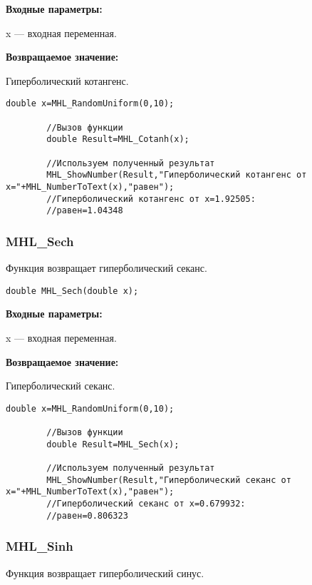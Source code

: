 \documentclass[a4paper,12pt]{article}
\begin{document}
\textbf{Входные параметры:}

 x --- входная переменная.

\textbf{Возвращаемое значение:}

Гиперболический котангенс.


\begin{lstlisting}[label=code_use_MHL_Cotanh,caption=Пример использования]
        double x=MHL_RandomUniform(0,10);

        //Вызов функции
        double Result=MHL_Cotanh(x);

        //Используем полученный результат
        MHL_ShowNumber(Result,"Гиперболический котангенс от x="+MHL_NumberToText(x),"равен");
        //Гиперболический котангенс от x=1.92505:
        //равен=1.04348
\end{lstlisting}

\subsubsection{MHL\_Sech}\label{MHL_Sech}

Функция возвращает гиперболический секанс.


\begin{lstlisting}[label=code_syntax_MHL_Sech,caption=Синтаксис]
double MHL_Sech(double x);
\end{lstlisting}

\textbf{Входные параметры:}

 x --- входная переменная.

\textbf{Возвращаемое значение:}

Гиперболический секанс.


\begin{lstlisting}[label=code_use_MHL_Sech,caption=Пример использования]
        double x=MHL_RandomUniform(0,10);

        //Вызов функции
        double Result=MHL_Sech(x);

        //Используем полученный результат
        MHL_ShowNumber(Result,"Гиперболический секанс от x="+MHL_NumberToText(x),"равен");
        //Гиперболический секанс от x=0.679932:
        //равен=0.806323
\end{lstlisting}

\subsubsection{MHL\_Sinh}\label{MHL_Sinh}

Функция возвращает гиперболический синус.
\end{document}
